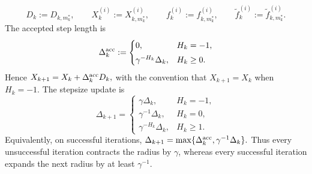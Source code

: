 \documentclass[11pt,a4paper]{article}
\newcommand{\sara}[1]{{\color{red}{\textbf{[SS: #1]}}\color{black}}}
\begin{document}
\[
    D_k:=D_{k,m_k^*},
    \qquad
    X_k^{(i)}:=X_{k,m_k^*}^{(i)},
    \qquad
    f_k^{(i)}:=f_{k,m_k^*}^{(i)},
    \qquad
    \tilde f_k^{(i)}:=\tilde f_{k,m_k^*}^{(i)}.
\]
The accepted step length is
\[
    \Delta_k^{\rm acc}
    :=
    \begin{cases}
        0, & H_k=-1,\\[1mm]
        \gamma^{-H_k}\Delta_k, & H_k\ge0.
    \end{cases}
\]
Hence $X_{k+1}=X_k+\Delta_k^{\rm acc}D_k,$
with the convention that $X_{k+1}=X_k$ when $H_k=-1$. The stepsize update is
\[
\Delta_{k+1}
=
\begin{cases}
    \gamma\Delta_k, & H_k=-1,\\[1mm]
    \gamma^{-1}\Delta_k, & H_k=0,\\[1mm]
    \gamma^{-H_k}\Delta_k, & H_k\ge1.
\end{cases}
\] %
Equivalently, on successful iterations,
$\Delta_{k+1}
    =
    \max\{\Delta_k^{\rm acc},\gamma^{-1}\Delta_k\}.$
Thus every unsuccessful iteration contracts the radius by $\gamma$, whereas
every successful iteration expands the next radius by at least $\gamma^{-1}$.
\end{document}

